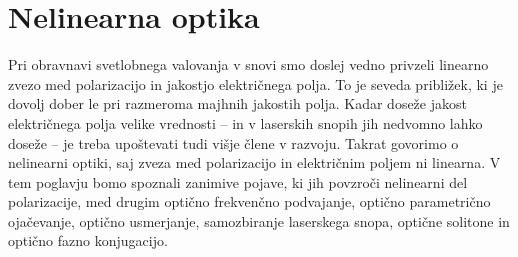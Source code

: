 
\chapter{Nelinearna optika}
\label{chap:NLO}
Pri obravnavi svetlobnega valovanja v snovi smo doslej vedno privzeli linearno 
zvezo med polarizacijo in jakostjo električnega polja. To 
je seveda približek, ki je dovolj dober le pri razmeroma majhnih jakostih
polja. Kadar doseže jakost električnega polja velike vrednosti -- in v laserskih snopih
jih nedvomno lahko doseže -- je treba upoštevati tudi višje člene v razvoju. Takrat
govorimo o nelinearni optiki, saj zveza med polarizacijo
in električnim poljem ni linearna. V tem poglavju bomo spoznali zanimive pojave, ki jih 
povzroči nelinearni del polarizacije, med drugim optično 
frekvenčno podvajanje, optično parametrično ojačevanje, optično usmerjanje, 
samozbiranje laserskega snopa, optične solitone in optično fazno konjugacijo. 

